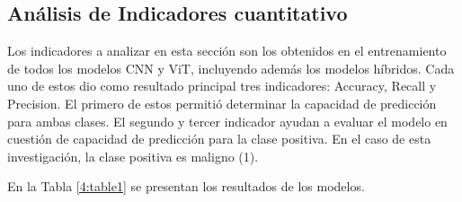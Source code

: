 \subsection{Análisis de Indicadores cuantitativo}
Los indicadores a analizar en esta sección son los obtenidos en el entrenamiento de todos los modelos CNN y ViT, incluyendo además los modelos híbridos. Cada uno de estos dio como resultado principal tres indicadores: Accuracy, Recall y Precision. El primero de estos permitió determinar la capacidad de predicción para ambas clases. El segundo y tercer indicador ayudan a evaluar el modelo en cuestión de capacidad de predicción para la clase positiva. En el caso de esta investigación, la clase positiva es maligno (1).

En la Tabla \ref{4:table1} se presentan los resultados de los modelos.

